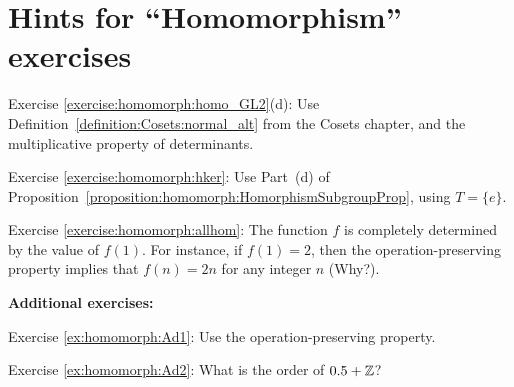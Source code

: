 \section{Hints for ``Homomorphism'' exercises}
\label{sec:Homomorphism:Hints} 


\noindent Exercise \ref{exercise:homomorph:homo_GL2}(d): 
Use Definition~\ref{definition:Cosets:normal_alt} from the Cosets chapter, and the multiplicative property of determinants.

\noindent Exercise \ref{exercise:homomorph:hker}:   Use Part~(d) of Proposition~\ref{proposition:homomorph:HomorphismSubgroupProp}, using  $T=\{e\}$.

\noindent Exercise \ref{exercise:homomorph:allhom}: 
The function $f$ is completely determined by the value of $f(1)$.  For instance, if $f(1)=2$, then the operation-preserving property implies that $f(n)=2n$ for any integer $n$ (Why?).
\bigskip

\textbf{Additional exercises:}

\noindent Exercise \ref{ex:homomorph:Ad1}:  Use the operation-preserving property.

\noindent Exercise \ref{ex:homomorph:Ad2}: What is the order of $0.5 + \mathbb{Z}$?

